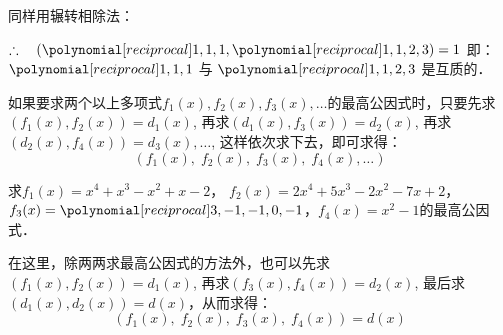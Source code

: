 \begin{solution}
同样用辗转相除法：
\begin{center}

\end{center}

$\therefore\quad (\poly{1,1,1}, \poly{1,1,2,3})=1$
即：$\poly{1,1,1}$ 与 $\poly{1,1,2,3}$ 是互质的．

\end{solution}

如果要求两个以上多项式$f_1(x),f_2(x),f_3(x),\ldots$的最高公因式时，只要先求$(f_1(x),f_2(x))=d_1(x)$, 再求$(d_1(x),f_3(x))=d_2(x)$, 再求$(d_2(x), f_4 (x))=d_3(x),\ldots$, 这样依次求下去，即可求得：
\[(f_1 (x),\; f_2 (x),\; f_3 (x),\; f_4(x),\ldots)\]


\begin{example}
求$f_1(x)=x^4+x^3-x^2+x-2$，
$f_2 (x) =2x^4+5x^3-2x^2-7x+2$，$f_3(x)=\poly{3,-1,-1,0,-1}$，$f_4(x)=x^2-1$的最高公因式．
\end{example}

\begin{note}
在这里，除两两求最高公因式的方法外，也可以先求$(f_1(x),f_2(x))=d_1(x)$, 再求$(f_3(x), f_4(x))=d_2(x)$, 最后求$(d_1(x),d_2(x))=d(x)$，从而求得：
\[(f_1 (x) ,\; f_2 (x),\; f_3 (x),\; f_4 (x)) =d(x)\]
\end{note}

